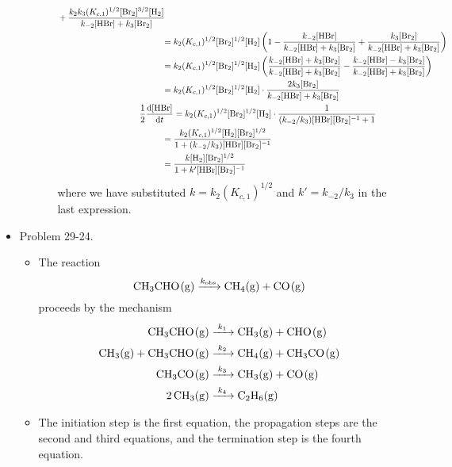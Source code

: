 \documentclass[../notes.tex]{subfiles}
\begin{document}
\begin{itemize}
\begin{itemize}
\begin{itemize}
\begin{align*}
\begin{split}
                    &+\frac{k_2k_3(K_{c,1})^{1/2}[\ce{Br2}]^{3/2}[\ce{H2}]}{k_{-2}[\ce{HBr}]+k_3[\ce{Br2}]}
                \end{split}\\
                ={}& k_2(K_{c,1})^{1/2}[\ce{Br2}]^{1/2}[\ce{H2}]\left( 1-\frac{k_{-2}[\ce{HBr}]}{k_{-2}[\ce{HBr}]+k_3[\ce{Br2}]}+\frac{k_3[\ce{Br2}]}{k_{-2}[\ce{HBr}]+k_3[\ce{Br2}]} \right)\\
                ={}& k_2(K_{c,1})^{1/2}[\ce{Br2}]^{1/2}[\ce{H2}]\left( \frac{k_{-2}[\ce{HBr}]+k_3[\ce{Br2}]}{k_{-2}[\ce{HBr}]+k_3[\ce{Br2}]}-\frac{k_{-2}[\ce{HBr}]-k_3[\ce{Br2}]}{k_{-2}[\ce{HBr}]+k_3[\ce{Br2}]} \right)\\
                ={}& k_2(K_{c,1})^{1/2}[\ce{Br2}]^{1/2}[\ce{H2}]\cdot\frac{2k_3[\ce{Br2}]}{k_{-2}[\ce{HBr}]+k_3[\ce{Br2}]}\\
                \frac{1}{2}\dv{[\ce{HBr}]}{t} &= k_2(K_{c,1})^{1/2}[\ce{Br2}]^{1/2}[\ce{H2}]\cdot\frac{1}{(k_{-2}/k_3)[\ce{HBr}][\ce{Br2}]^{-1}+1}\\
                ={}& \frac{k_2(K_{c,1})^{1/2}[\ce{H2}][\ce{Br2}]^{1/2}}{1+(k_{-2}/k_3)[\ce{HBr}][\ce{Br2}]^{-1}}\\
                ={}& \frac{k[\ce{H2}][\ce{Br2}]^{1/2}}{1+k'[\ce{HBr}][\ce{Br2}]^{-1}}
            \end{align*}
            where we have substituted $k=k_2(K_{c,1})^{1/2}$ and $k'=k_{-2}/k_3$ in the last expression.
        \end{itemize}
    \end{itemize}
    \item Problem 29-24.
    \begin{itemize}
        \item The reaction
        \begin{equation*}
            \ce{CH3CHO(g) ->[$k_\text{obs}$] CH4(g) + CO(g)}
        \end{equation*}
        proceeds by the mechanism
        \begin{align*}
            \ce{CH3CHO(g)} &\ce{->[$k_1$]} \ce{CH3(g) + CHO(g)}\\
            \ce{CH3(g) + CH3CHO(g)} &\ce{->[$k_2$]} \ce{CH4(g) + CH3CO(g)}\\
            \ce{CH3CO(g)} &\ce{->[$k_3$]} \ce{CH3(g) + CO(g)}\\
            \ce{2CH3(g)} &\ce{->[$k_4$]} \ce{C2H6(g)}
        \end{align*}
        \item The initiation step is the first equation, the propagation steps are the second and third equations, and the termination step is the fourth equation.

\end{itemize}
\end{itemize}
\end{document}
